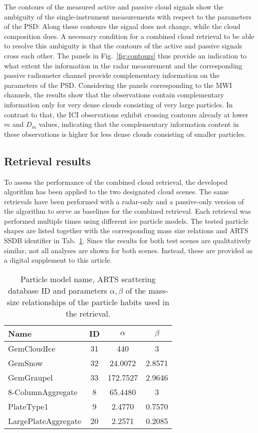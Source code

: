 \documentclass[journal abbreviation, manuscript]{copernicus}
\begin{document}
The contours of the measured active and passive cloud signals show the ambiguity
of the single-instrument measurements with respect to the parameters of the PSD:
Along these contours the signal does not change, while the cloud composition
does. A necessary condition for a combined cloud retrieval to be able to resolve
this ambiguity is that the contours of the active and passive signals cross each
other. The panels in Fig.~\ref{fig:contours} thus provide an indication to what
extent the information in the radar measurement and the corresponding passive
radiometer channel provide complementary information on the parameters of the
PSD. Considering the panels corresponding to the MWI channels, the results show
that the observations contain complementary information only for very dense
clouds consisting of very large particles. In contrast to that, the ICI
observations exhibit crossing contours already at lower $m$ and $D_m$ values,
indicating that the complementary information content in these observations is
higher for less dense clouds consisting of smaller particles.

\subsection{Retrieval results}

To assess the performance of the combined cloud retrieval, the developed
algorithm has been applied to the two designated cloud scenes. The same
retrievals have been performed with a radar-only and a passive-only version of
the algorithm to serve as baselines for the combined retrieval. Each retrieval
was performed multiple times using different ice particle models. The tested
particle shapes are listed together with the corresponding mass size relations
and ARTS SSDB identifier in Tab.~\ref{tab:particles_retrieval}. Since the
results for both test scenes are qualitatively similar, not all analyses are
shown for both scenes. Instead, these are provided as a digital supplement to
this article.

\begin{table}
  \centering
  \caption{Particle model name, ARTS scattering database ID and parameters
    $\alpha, \beta$ of the mass-size relationships of the particle habits used
    in the retrieval.}
  \begin{tabular}{l|c|c|c}
    Name & ID & $\alpha$ & $\beta$ \\
    \hline
    GemCloudIce         & 31  & 440      & 3 \\
    GemSnow             & 32  & 24.0072  & 2.8571 \\
    GemGraupel          & 33  & 172.7527 & 2.9646 \\
    8-ColumnAggregate   &  8  & 65.4480  & 3      \\
    PlateType1          &  9  & 2.4770   & 0.7570 \\
    LargePlateAggregate &  20 & 2.2571   & 0.2085 \\
  \end{tabular}
  \label{tab:particles_retrieval}
\end{table}
\end{document}
